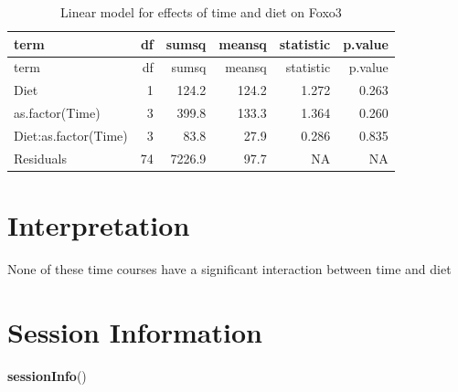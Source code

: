 \documentclass[]{article}
\newenvironment{Shaded}{\begin{snugshade}}{\end{snugshade}}
\newcommand{\KeywordTok}[1]{\textcolor[rgb]{0.13,0.29,0.53}{\textbf{#1}}}
\newcommand{\NormalTok}[1]{#1}
\begin{document}
\begin{longtable}[]{@{}lrrrrr@{}}
\caption{Linear model for effects of time and diet on
Foxo3}\tabularnewline
\toprule
term & df & sumsq & meansq & statistic & p.value\tabularnewline
\midrule
\endfirsthead
\toprule
term & df & sumsq & meansq & statistic & p.value\tabularnewline
\midrule
\endhead
Diet & 1 & 124.2 & 124.2 & 1.272 & 0.263\tabularnewline
as.factor(Time) & 3 & 399.8 & 133.3 & 1.364 & 0.260\tabularnewline
Diet:as.factor(Time) & 3 & 83.8 & 27.9 & 0.286 & 0.835\tabularnewline
Residuals & 74 & 7226.9 & 97.7 & NA & NA\tabularnewline
\bottomrule
\end{longtable}

\section{Interpretation}\label{interpretation}

None of these time courses have a significant interaction between time
and diet

\section{Session Information}\label{session-information}

\begin{Shaded}
\begin{Highlighting}[]
\KeywordTok{sessionInfo}\NormalTok{()}
\end{Highlighting}
\end{Shaded}
\end{document}
